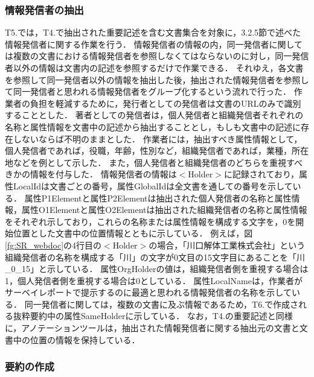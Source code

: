 \documentclass[japanese]{jnlp_1.4}
\begin{document}
\subsubsection{情報発信者の抽出}

T5.では，T4.で抽出された重要記述を含む文書集合を対象に，3.2.5節で述べた情報発信者に関する作業を行う．
情報発信者の情報の内，同一発信者に関しては複数の文書における情報発信者を参照しなくてはならないのに対し，同一発信者以外の情報は文書内の記述を参照するだけで作業できる．
それゆえ，各文書を参照して同一発信者以外の情報を抽出した後，抽出された情報発信者を参照して同一発信者と思われる情報発信者をグループ化するという流れで行った．
作業者の負担を軽減するために，発行者としての発信者は文書のURLのみで識別することとした．
著者としての発信者は，個人発信者と組織発信者それぞれの名称と属性情報を文書中の記述から抽出することとし，もしも文書中の記述に存在しないならば不明のままとした．
{作業者には，}抽出すべき属性情報として，個人発信者であれば，役職，年齢，性別など，組織発信者であれば，業種，所在地などを例として示した．
また，個人発信者と組織発信者のどちらを重視すべきかの情報を付与した．
情報発信者の情報は{\sf $<$Holder$>$}に記録されており，属性{\sf LocalId}は文書ごとの番号，属性{\sf GlobalId}は全文書を通しての番号を示している．
属性{\sf P1Element}と属性{\sf P2Element}は抽出された個人発信者の名称と属性情報，属性{\sf O1Element}と属性{\sf O2Element}は抽出された組織発信者の名称と属性情報をそれぞれ示しており，これらの名称または属性情報を構成する文字を，0を開始位置とした文書中の位置情報とともに示している．
例えば，図\ref{fg:SR_webdoc}の4行目の{\sf $<$Holder$>$}の場合，「川口解体工業株式会社」という組織発信者の名称を構成する「川」の文字が0文目の15文字目にあることを「川\_0\_15」と示している．
属性{\sf OrgHolder}の値は，組織発信者{側}を重視する場合は1，個人発信者{側}を重視する場合は0としている．
属性{\sf LocalName}は，作業者がサーベイレポートで提示するのに最適と思われる情報発信者の名称を示している．
同一発信者に関しては，複数の文書に及ぶ情報であるため，T6.で作成される抜粋要約中の属性{\sf SameHolder}に示している．
なお，T4.の重要記述と同様に，アノテーションツールは，抽出された情報発信者に関する抽出元の文書と文書中の位置の情報を保持している．


\subsubsection{要約の作成}
\end{document}
